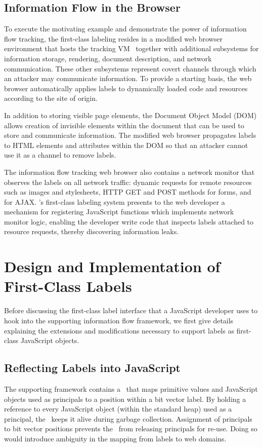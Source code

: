 \subsection{Information Flow in the Browser}

To execute the motivating example and demonstrate the power of information flow tracking, the first-class labeling resides in a modified web browser environment that hosts the tracking VM \JitFlow\ together with additional subsystems for information storage, rendering, document description, and network communication.
These other subsystems represent covert channels through which an attacker may communicate information.
To provide a starting basis, the web browser automatically applies labels to dynamically loaded code and resources according to the site of origin.

In addition to storing visible page elements, the Document Object Model (DOM) allows creation of invisible elements within the document that can be used to store and communicate information.
The modified web browser propagates labels to HTML elements and attributes within the DOM so that an attacker cannot use it as a channel to remove labels.

The information flow tracking web browser also contains a network monitor that observes the labels on all network traffic: dynamic requests for remote resources such as images and stylesheets, HTTP GET and POST methods for forms, and  for AJAX.
\JitFlow's first-class labeling system presents to the web developer a mechanism for registering JavaScript functions which implements network monitor logic, enabling the developer write code that inspects labels attached to resource requests, thereby discovering information leaks.

\section{Design and Implementation of First-Class Labels}
\label{sec:first-class-implementation}

Before discussing the first-class label interface that a JavaScript developer uses to hook into the supporting information flow framework, we first give details explaining the extensions and modifications necessary to support labels as first-class JavaScript objects.

\subsection{Reflecting Labels into JavaScript}
The supporting framework contains a \FlowLabelRegistry\ that maps primitive values and JavaScript objects used as principals to a position within a bit vector label.
By holding a reference to every JavaScript object (within the standard heap) used as a principal, the \FlowLabelRegistry\ keeps it alive during garbage collection.
Assignment of principals to bit vector positions prevents the \FlowLabelRegistry\ from releasing principals for re-use.
Doing so would introduce ambiguity in the mapping from labels to web domains.

